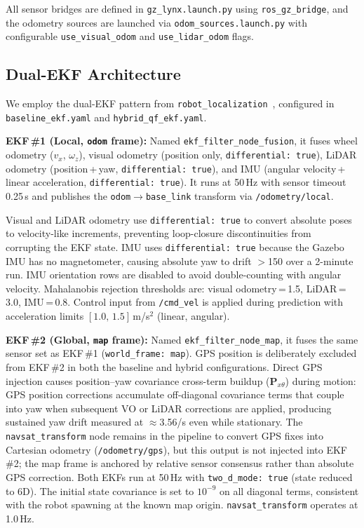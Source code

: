 \documentclass[conference]{IEEEtran}
\begin{document}
All sensor bridges are defined in \texttt{gz\_lynx.launch.py} using
\texttt{ros\_gz\_bridge}, and the odometry sources are launched via
\texttt{odom\_sources.launch.py} with configurable \texttt{use\_visual\_odom} and
\texttt{use\_lidar\_odom} flags.

\subsection{Dual-EKF Architecture}

We employ the dual-EKF pattern from
\texttt{robot\_localization}~\cite{robotlocalization}, configured in
\texttt{baseline\_ekf.yaml} and \texttt{hybrid\_qf\_ekf.yaml}.

\noindent\textbf{EKF\,\#1 (Local, \texttt{odom} frame):} Named
\texttt{ekf\_filter\_node\_fusion}, it fuses wheel odometry ($v_x$, $\omega_z$),
visual odometry (position only, \texttt{differential:\,true}), LiDAR odometry
(position\,+\,yaw, \texttt{differential:\,true}), and IMU (angular velocity\,+
linear acceleration, \texttt{differential:\,true}). It runs at 50\,Hz with sensor
timeout 0.25\,s and publishes the \texttt{odom}$\rightarrow$\texttt{base\_link}
transform via \texttt{/odometry/local}.

Visual and LiDAR odometry use \texttt{differential: true} to convert absolute poses
to velocity-like increments, preventing loop-closure discontinuities from corrupting
the EKF state. IMU uses \texttt{differential: true} because the Gazebo IMU has no
magnetometer, causing absolute yaw to drift $>$150\textdegree{} over a 2-minute
run. IMU orientation rows are disabled to avoid double-counting with angular
velocity. Mahalanobis rejection thresholds are: visual odometry\,=\,1.5,
LiDAR\,=\,3.0, IMU\,=\,0.8. Control input from \texttt{/cmd\_vel} is applied during
prediction with acceleration limits $[1.0,\,1.5]$\,m/s$^2$ (linear, angular).

\noindent\textbf{EKF\,\#2 (Global, \texttt{map} frame):} Named
\texttt{ekf\_filter\_node\_map}, it fuses the same sensor set as EKF\,\#1
(\texttt{world\_frame: map}). GPS position is deliberately excluded from EKF\,\#2
in both the baseline and hybrid configurations. Direct GPS injection causes
position--yaw covariance cross-term buildup ($\mathbf{P}_{x\theta}$) during motion:
GPS position corrections accumulate off-diagonal covariance terms that couple into
yaw when subsequent VO or LiDAR corrections are applied, producing sustained yaw
drift measured at $\approx$3.56\textdegree/s even while stationary. The
\texttt{navsat\_transform} node remains in the pipeline to convert GPS fixes into
Cartesian odometry (\texttt{/odometry/gps}), but this output is not injected into
EKF\,\#2; the map frame is anchored by relative sensor consensus rather than
absolute GPS correction. Both EKFs run at 50\,Hz with \texttt{two\_d\_mode: true}
(state reduced to 6D). The initial state covariance is set to $10^{-9}$ on all
diagonal terms, consistent with the robot spawning at the known map origin.
\texttt{navsat\_transform} operates at 1.0\,Hz.
\end{document}
